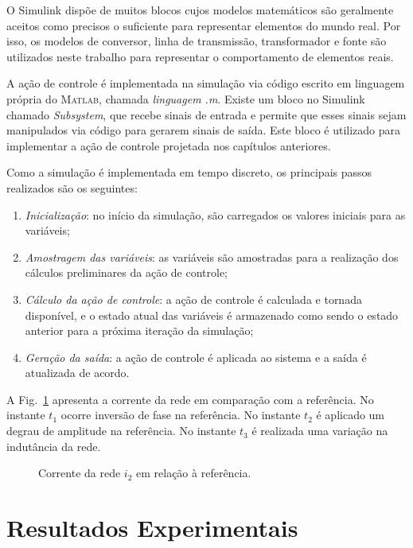 	O Simulink dispõe de muitos blocos cujos modelos matemáticos são geralmente aceitos como precisos o suficiente para representar elementos do mundo real. Por isso, os modelos de conversor, linha de transmissão, transformador e fonte são utilizados neste trabalho para representar o comportamento de elementos reais.

	A ação de controle é implementada na simulação via código escrito em linguagem própria do \textsc{Matlab}, chamada \textit{linguagem .m}. Existe um bloco no Simulink chamado \textit{Subsystem}, que recebe sinais de entrada e permite que esses sinais sejam manipulados via código para gerarem sinais de saída. Este bloco é utilizado para implementar a ação de controle projetada nos capítulos anteriores.

	Como a simulação é implementada em tempo discreto, os principais passos realizados são os seguintes:

	\begin{enumerate}
		\item \textit{Inicialização}: no início da simulação, são carregados os valores iniciais para as variáveis;
		\item \textit{Amostragem das variáveis}: as variáveis são amostradas para a realização dos cálculos preliminares da ação de controle;
		\item \textit{Cálculo da ação de controle}: a ação de controle é calculada e tornada disponível, e o estado atual das variáveis é armazenado como sendo o estado anterior para a próxima iteração da simulação;
		\item \textit{Geração da saída}: a ação de controle é aplicada ao sistema e a saída é atualizada de acordo.
	\end{enumerate}

	A Fig.~\ref{fig:i2_simulacao} apresenta a corrente da rede em comparação com a referência. No instante $t_1$ ocorre inversão de fase na referência. No instante $t_2$ é aplicado um degrau de amplitude na referência. No instante $t_3$ é realizada uma variação na indutância da rede.

	\begin{figure}[htb]
        \centering{
            \def\svgwidth{0.6\textwidth}
            }
        \renewcommand\figurename{Fig.}
        \caption{Corrente da rede $i_2$ em relação à referência.}
        \label{fig:i2_simulacao}
    \end{figure}

\section{Resultados Experimentais}



